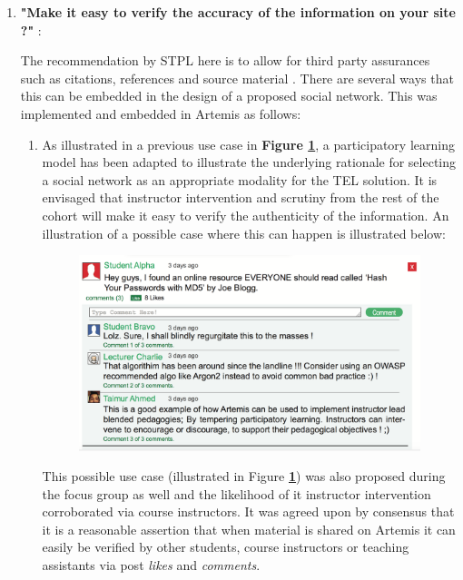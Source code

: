 \begin{enumerate}
    \item \textbf{"Make it easy to verify the accuracy of the information on your site ?"} \cite{Fogg2002a}:
    
    The recommendation by STPL here is to allow for third party assurances such as citations, references and source material \cite{Fogg2002a}. There are several ways that this can be embedded in the design of a proposed social network. This was implemented and embedded in Artemis as follows:
    \begin{enumerate}
        
        \item As illustrated in a previous use case in \textbf{Figure \ref{fig:UseCaseParticipatory}}, a participatory learning model has been adapted to illustrate the underlying rationale for selecting a social network as an appropriate  modality for the TEL solution. It is envisaged that instructor intervention and scrutiny from the rest of the cohort will make it easy to verify the authenticity of the information. An illustration of a possible case where this can happen is illustrated below:
            
        \begin{figure}[H]
        	\centering
        	\includegraphics[scale=0.45,right]{chapters/chapter03/figures/comment.png}
        	\label{fig:UseCaseParticipatory}
        \end{figure}
        
        This possible use case (illustrated in Figure \textbf{\ref{fig:UseCaseParticipatory}}) was also proposed during the focus group as well and the likelihood of it instructor intervention corroborated via course instructors. It was agreed upon by consensus that it is a reasonable assertion that when material is shared on Artemis it can easily be verified by other students, course instructors or teaching assistants via post \textit{likes} and \textit{comments}.
    

\end{enumerate}
\end{enumerate}
